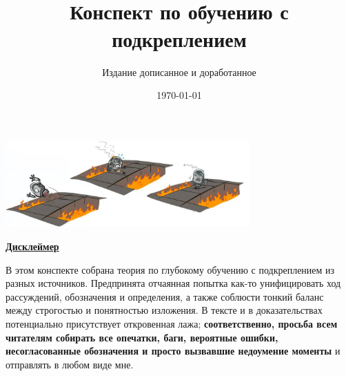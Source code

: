 \documentclass[a4paper, 10pt, oneside]{memoir}
\title{
\vspace{4cm}
\normalfont \normalsize 
\horrule{0.5pt} \\[0.4cm]
\huge Конспект по обучению с подкреплением
\horrule{2pt} \\[0.5cm]
}
\author{Издание дописанное и доработанное}
\date{\normalsize\today}
\begin{document}

\maketitle
\thispagestyle{empty}

\begin{center}
    \includegraphics[width=0.7\textwidth]{Images/robot.png}
\end{center}

\vspace{2cm}
\begin{center}
\textcolor{ChadBlue}{\underline{\textbf{Дисклеймер}}}
\end{center}

\vspace{0.75cm}
В этом конспекте собрана теория по глубокому обучению с подкреплением из разных источников. Предпринята отчаянная попытка как-то унифицировать ход рассуждений, обозначения и определения, а также соблюсти тонкий баланс между строгостью и понятностью изложения. В тексте и в доказательствах потенциально присутствует откровенная лажа; \textbf{соответственно, просьба всем читателям собирать все опечатки, баги, вероятные ошибки, несогласованные обозначения и просто вызвавшие недоумение моменты} и отправлять в любом виде мне.



\end{document}

